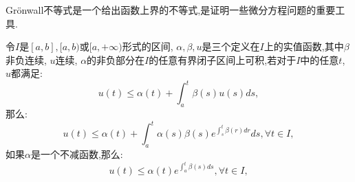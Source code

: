 Grönwall不等式是一个给出函数上界的不等式,是证明一些微分方程问题的重要工具. 
\begin{thm}\cite{enwiki:1216903952}
    令$I$是$[a,b],[a,b)$或$[a,+\infty)$形式的区间, $\alpha,\beta,u$是三个定义在$I$上的实值函数,其中$\beta$非负连续, $u$连续, $\alpha$的非负部分在$I$的任意有界闭子区间上可积,若对于$I$中的任意$t$, $u$都满足:
    \begin{equation}\label{eq:gronwall}
        u(t) \leq \alpha(t) + \int_{a}^{t} \beta(s)u(s) ds,
    \end{equation}
    那么:
    \begin{equation}
        u(t) \leq \alpha(t) + \int_{a}^{t} \alpha(s)\beta(s) e^{\int_{s}^{t} \beta(r) dr} ds,\forall t \in I,
    \end{equation}
    如果$\alpha$是一个不减函数,那么:
    \begin{equation}\label{eq:gronwall2}
        u(t) \leq \alpha(t) e^{\int_{a}^{t} \beta(s) ds},\forall t \in I,
    \end{equation}
\end{thm}
